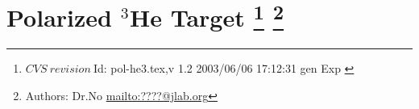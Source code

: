 \section[Polarized $^3$He Target]{Polarized $^3$He Target
\footnote{
  $CVS~revision~ $Id: pol-he3.tex,v 1.2 2003/06/06 17:12:31 gen Exp $ $
}
\footnote{Authors: Dr.No \url{mailto:????@jlab.org}}
}
%
%
%
%
